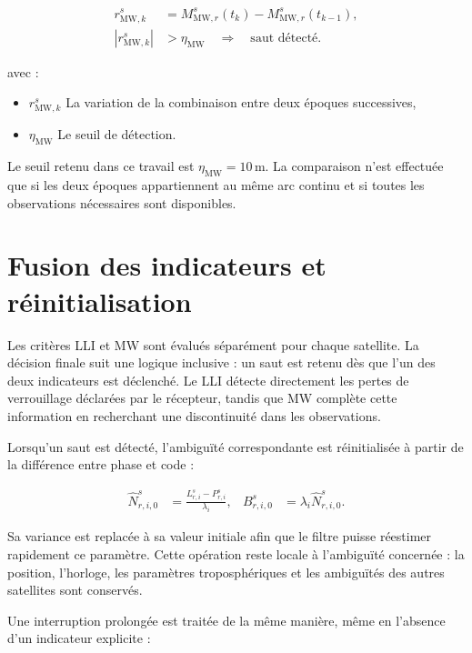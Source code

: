 \begin{align}
r_{\mathrm{MW},k}^s
&=M_{\mathrm{MW},r}^s(t_k)-M_{\mathrm{MW},r}^s(t_{k-1}),
\\
\left|r_{\mathrm{MW},k}^s\right|
&>\eta_{\mathrm{MW}}
\quad\Longrightarrow\quad
\text{saut détecté}.
\label{ann:eq:melbourne_wubbena_detection}
\end{align}

avec :

\begin{itemize}
    \item $r_{\mathrm{MW},k}^s$ La variation de la combinaison entre deux
    époques successives,
    \item $\eta_{\mathrm{MW}}$ Le seuil de détection.
\end{itemize}

Le seuil retenu dans ce travail est $\eta_{\mathrm{MW}}=10\,\mathrm{m}$. La
comparaison n'est effectuée que si les deux époques appartiennent au même arc
continu et si toutes les observations nécessaires sont disponibles.

\section{Fusion des indicateurs et réinitialisation}

Les critères LLI et MW sont évalués séparément pour chaque satellite. La
décision finale suit une logique inclusive : un saut est retenu dès que l'un
des deux indicateurs est déclenché. Le LLI détecte directement les pertes de
verrouillage déclarées par le récepteur, tandis que MW complète cette
information en recherchant une discontinuité dans les observations.

Lorsqu'un saut est détecté, l'ambiguïté correspondante est réinitialisée à
partir de la différence entre phase et code :

\begin{align}
\widehat N_{r,i,0}^s
&=\frac{L_{r,i}^s-P_{r,i}^s}{\lambda_i},
&
B_{r,i,0}^s
&=\lambda_i\widehat N_{r,i,0}^s.
\label{ann:eq:ambiguity_reset}
\end{align}

Sa variance est replacée à sa valeur initiale afin que le filtre puisse
réestimer rapidement ce paramètre. Cette opération reste locale à l'ambiguïté
concernée : la position, l'horloge, les paramètres troposphériques et les
ambiguïtés des autres satellites sont conservés.

Une interruption prolongée est traitée de la même manière, même en l'absence
d'un indicateur explicite :

